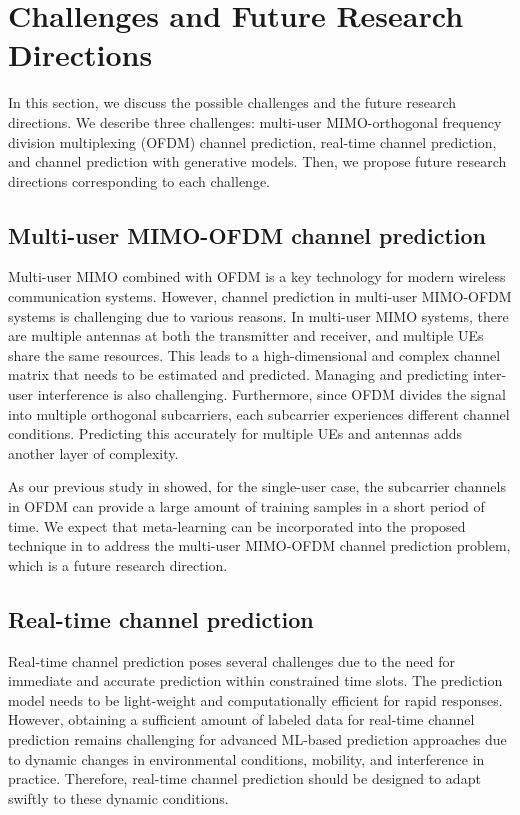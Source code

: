 \documentclass[lettersize,journal]{IEEEtran}
\begin{document}
\section{Challenges and Future Research Directions}
In this section, we discuss the possible challenges and the future research directions. We describe three challenges: multi-user MIMO-orthogonal frequency division multiplexing (OFDM) channel prediction, real-time channel prediction, and channel prediction with generative models. Then, we propose future research directions corresponding to each challenge.

\subsection{Multi-user MIMO-OFDM channel prediction}
Multi-user MIMO combined with OFDM is a key technology for modern wireless communication systems. However, channel prediction in multi-user MIMO-OFDM systems is challenging due to various reasons. In multi-user MIMO systems, there are multiple antennas at both the transmitter and receiver, and multiple UEs share the same resources. This leads to a high-dimensional and complex channel matrix that needs to be estimated and predicted. %
Managing and predicting inter-user interference is also challenging. Furthermore, since OFDM divides the signal into multiple orthogonal subcarriers, each subcarrier experiences different channel conditions. Predicting this accurately for multiple UEs and antennas adds another layer of complexity.

As our previous study in \cite{Ko2022} showed, for the single-user case, the subcarrier channels in OFDM can provide a large amount of training samples in a short period of time. %
We expect that meta-learning can be incorporated into the proposed technique in \cite{Ko2022} to address the multi-user MIMO-OFDM channel prediction problem, which is a future research direction.

\subsection{Real-time channel prediction}
Real-time channel prediction poses several challenges due to the need for immediate and accurate prediction within constrained time slots. The prediction model needs to be light-weight and computationally efficient for rapid responses. %
However, obtaining a sufficient amount of labeled data for real-time channel prediction remains challenging for advanced ML-based prediction approaches due to dynamic changes in environmental conditions, mobility, and interference in practice. Therefore, real-time channel prediction should be designed to adapt swiftly to these dynamic conditions.
\end{document}
